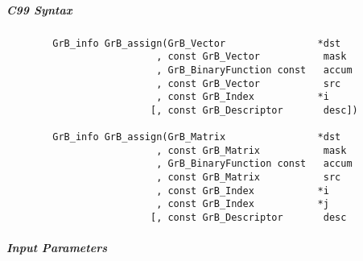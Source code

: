 \subparagraph{C99 Syntax}

\begin{verbatim}
        GrB_info GrB_assign(GrB_Vector                *dst
                          , const GrB_Vector           mask
                          , GrB_BinaryFunction const   accum
                          , const GrB_Vector           src
                          , const GrB_Index           *i
                         [, const GrB_Descriptor       desc])

        GrB_info GrB_assign(GrB_Matrix                *dst
                          , const GrB_Matrix           mask
                          , GrB_BinaryFunction const   accum
                          , const GrB_Matrix           src
                          , const GrB_Index           *i
                          , const GrB_Index           *j
                         [, const GrB_Descriptor       desc
\end{verbatim}

\subparagraph{Input Parameters}

